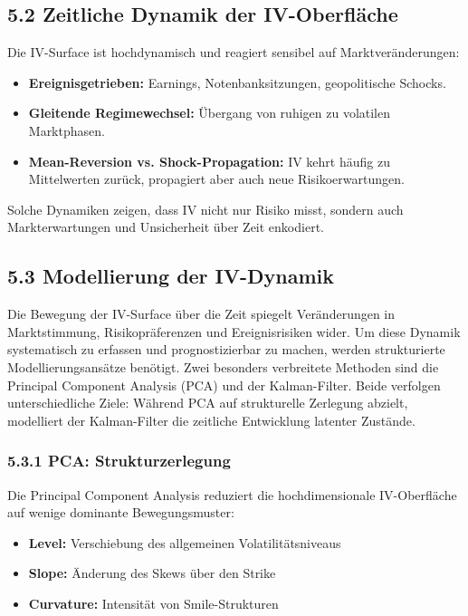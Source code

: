 \documentclass[a4paper,12pt]{article}
\begin{document}
\subsection*{5.2 Zeitliche Dynamik der IV-Oberfläche}

Die IV-Surface ist hochdynamisch und reagiert sensibel auf Marktveränderungen:
\begin{itemize}
  \item \textbf{Ereignisgetrieben:} Earnings, Notenbanksitzungen, geopolitische Schocks.
  \item \textbf{Gleitende Regimewechsel:} Übergang von ruhigen zu volatilen Marktphasen.
  \item \textbf{Mean-Reversion vs. Shock-Propagation:} IV kehrt häufig zu Mittelwerten zurück, propagiert aber auch neue Risikoerwartungen.
\end{itemize}

Solche Dynamiken zeigen, dass IV nicht nur Risiko misst, sondern auch Markterwartungen und Unsicherheit über Zeit enkodiert.
\subsection*{5.3 Modellierung der IV-Dynamik}

Die Bewegung der IV-Surface über die Zeit spiegelt Veränderungen in Marktstimmung, Risikopräferenzen und Ereignisrisiken wider. Um diese Dynamik systematisch zu erfassen und prognostizierbar zu machen, werden strukturierte Modellierungsansätze benötigt. Zwei besonders verbreitete Methoden sind die Principal Component Analysis (PCA) und der Kalman-Filter. Beide verfolgen unterschiedliche Ziele: Während PCA auf strukturelle Zerlegung abzielt, modelliert der Kalman-Filter die zeitliche Entwicklung latenter Zustände.

\subsubsection*{5.3.1 PCA: Strukturzerlegung}

Die Principal Component Analysis reduziert die hochdimensionale IV-Oberfläche auf wenige dominante Bewegungsmuster:
\begin{itemize}
  \item \textbf{Level:} Verschiebung des allgemeinen Volatilitätsniveaus
  \item \textbf{Slope:} Änderung des Skews über den Strike
  \item \textbf{Curvature:} Intensität von Smile-Strukturen
\end{itemize}
\end{document}
